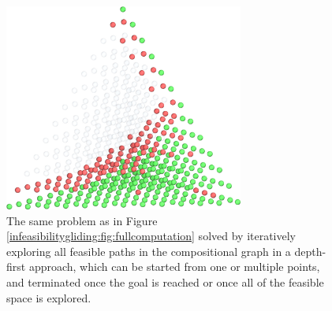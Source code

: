 \begin{figure}[H]
    \centering
    \includegraphics[width=0.7\textwidth]{infeasibilitygliding/InfeasibilityGliding_Glide.jpeg}
    \caption{The same problem as in Figure \ref{infeasibilitygliding:fig:fullcomputation} solved by iteratively exploring all feasible paths in the compositional graph in a depth-first approach, which can be started from one or multiple points, and terminated once the goal is reached or once all of the feasible space is explored.}
    \label{infeasibilitygliding:fig:glide}
\end{figure}

